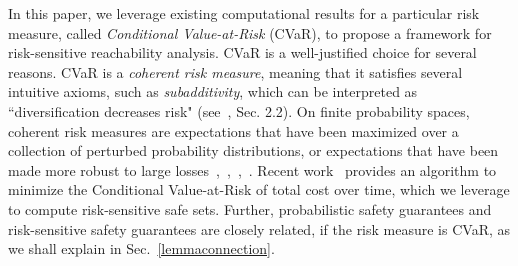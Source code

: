 \documentclass[letterpaper, 10 pt, conference]{ieeeconf}  %
\begin{document}
In this paper, we leverage existing computational results for a particular risk measure, called \textit{Conditional Value-at-Risk} (CVaR),
to propose a framework for risk-sensitive reachability analysis. 
CVaR is a well-justified choice for several reasons.
CVaR is a \textit{coherent risk measure}, meaning that it satisfies several intuitive axioms, such as \textit{subadditivity},
which can be interpreted as ``diversification decreases risk" (see~\cite{kisiala2015conditional}, Sec. 2.2).
On finite probability spaces, coherent risk measures are expectations that have been maximized over a collection of perturbed probability distributions,
or expectations that have been made more robust to large losses~\cite{chow2014framework},~\cite{shapiro2009lectures},~\cite{chow2015risk},~\cite{artzner1999coherent}.
Recent work~\cite{chow2015risk} provides an algorithm to minimize the Conditional Value-at-Risk of total cost over time, 
which we leverage to compute risk-sensitive safe sets. Further, probabilistic safety guarantees and 
risk-sensitive safety guarantees are closely related, if the risk measure is CVaR, as we shall explain in Sec.~\ref{lemmaconnection}.
\end{document}
